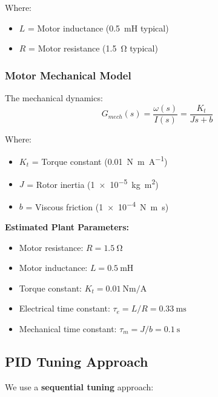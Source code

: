 \documentclass[11pt,letterpaper]{article}
\begin{document}
Where:
\begin{itemize}
    \item $L$ = Motor inductance (\SI{0.5}{\milli\henry} typical)
    \item $R$ = Motor resistance (\SI{1.5}{\ohm} typical)
\end{itemize}

\subsubsection{Motor Mechanical Model}
The mechanical dynamics:
\begin{equation}
G_{mech}(s) = \frac{\omega(s)}{I(s)} = \frac{K_t}{Js + b}
\end{equation}

Where:
\begin{itemize}
    \item $K_t$ = Torque constant (\SI{0.01}{\newton\meter\per\ampere})
    \item $J$ = Rotor inertia (\SI{1e-5}{\kilogram\meter\squared})
    \item $b$ = Viscous friction (\SI{1e-4}{\newton\meter\second})
\end{itemize}

\begin{ournumbers}
\textbf{Estimated Plant Parameters:}
\begin{itemize}[noitemsep]
    \item Motor resistance: $R = \SI{1.5}{\ohm}$
    \item Motor inductance: $L = \SI{0.5}{\milli\henry}$
    \item Torque constant: $K_t = \SI{0.01}{\newton\meter\per\ampere}$
    \item Electrical time constant: $\tau_e = L/R = \SI{0.33}{\milli\second}$
    \item Mechanical time constant: $\tau_m = J/b = \SI{0.1}{\second}$
\end{itemize}
\end{ournumbers}

\subsection{PID Tuning Approach}

We use a \textbf{sequential tuning} approach:
\end{document}
